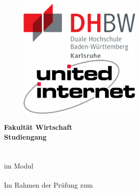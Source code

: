 
\begin{titlepage}
    \centering
    \vspace*{-3cm}
    
    \begin{figure}[h!]
        \centering
        \includegraphics[width=6cm]{images/DHBW_logo.pdf}
        \ifseminararbeit
        \else
            \hspace{1cm}
            \includegraphics[width=6cm]{images/company_logo.pdf}
        \fi
        \vspace{0.5cm}
    \end{figure}
    
    \large \textbf{Fakultät Wirtschaft} \\ 
    \vspace{0.5cm}
    \large \textbf{Studiengang \courseOfStudies} \\ 
    
    \vfill  %
    \LARGE \textbf {\thesisTitle} \\
    
    \vfill  %
    \Large \textbf{\thesisType} \\
    \ifseminararbeit
    \Large im Modul \\
    \textbf{\module} \\
    \vspace{0.3cm}
    \else
    \vspace{1cm}
    \fi
    \normalsize Im Rahmen der Prüfung zum \degree \\
    

\end{titlepage}
